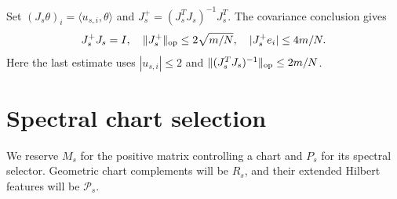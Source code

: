 \documentclass[11pt]{article}
\theoremstyle{remark}\newtheorem{remark}[theorem]{Remark}
\numberwithin{equation}{section}
\newcommand{\ip}[2]{\langle #1,#2\rangle}
\newcommand{\norm}[1]{\lVert #1\rVert}
\begin{document}
Set $(J_s\theta)_i=\ip{u_{s,i}}\theta$ and
$J_s^+=(J_s^TJ_s)^{-1}J_s^T$. The covariance conclusion gives
\begin{equation}\label{eq:pseudoinverse}
 J_s^+J_s=I,\quad
 \norm{J_s^+}_{\op}\le2\sqrt{m/N},\quad
 |J_s^+e_i|\le4m/N.
\end{equation}
Here the last estimate uses $|u_{s,i}|\le2$ and
$\norm{(J_s^TJ_s)^{-1}}_{\op}\le2m/N$.

\section{Spectral chart selection}\label{sec:selector}
We reserve $M_s$ for the positive matrix controlling a chart and $P_s$
for its spectral selector. Geometric chart complements will be $R_s$,
and their extended Hilbert features will be $\mathcal P_s$.
\end{document}
